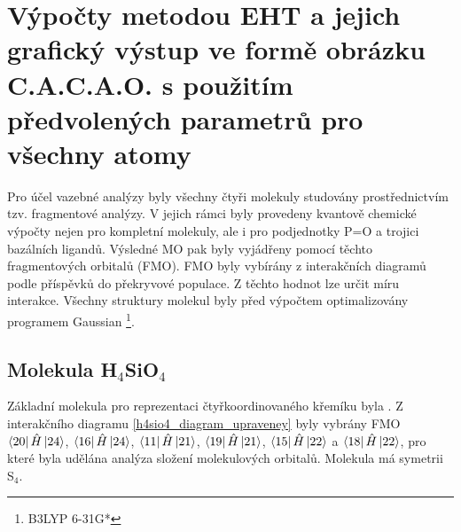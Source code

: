 \documentclass[
  digital, %
  table,   %
  lof,     %
  lot,     %
]{fithesis3}
\begin{document}
\section{Výpočty metodou EHT a jejich grafický výstup ve formě obrázku C.A.C.A.O. s použitím předvolených parametrů pro všechny atomy} \label{kapitola_EHT}
Pro účel vazebné analýzy byly všechny čtyři molekuly studovány prostřednictvím tzv. fragmentové analýzy. V jejich rámci byly provedeny kvantově chemické výpočty nejen pro kompletní molekuly, ale i pro podjednotky P=O a trojici bazálních ligandů. Výsledné MO pak byly vyjádřeny pomocí těchto fragmentových orbitalů (FMO). FMO byly vybírány z interakčních diagramů podle příspěvků do překryvové populace. Z těchto hodnot lze určit míru interakce. Všechny struktury molekul byly před výpočtem optimalizovány programem Gaussian \cite{g09} \footnote{B3LYP 6-31G*}.
\subsection{Molekula H$_4$SiO$_4$}
Základní molekula pro reprezentaci čtyřkoordinovaného křemíku byla . Z interakčního diagramu \ref{h4sio4_diagram_upraveney} byly vybrány FMO $\bra{20}{\hat{H}}\ket{24}$, $\bra{16}{\hat{H}}\ket{24}$, $\bra{11}{\hat{H}}\ket{21}$, $\bra{19}{\hat{H}}\ket{21}$, $\bra{15}{\hat{H}}\ket{22}$ a $\bra{18}{\hat{H}}\ket{22}$, pro které byla udělána analýza složení molekulových orbitalů. Molekula má symetrii S$_4$. 

\begin{figure}
\begin{center}
\label{obr_h4sio4_vysledky_I}
\end{center}
\end{figure}
 
\end{document}
